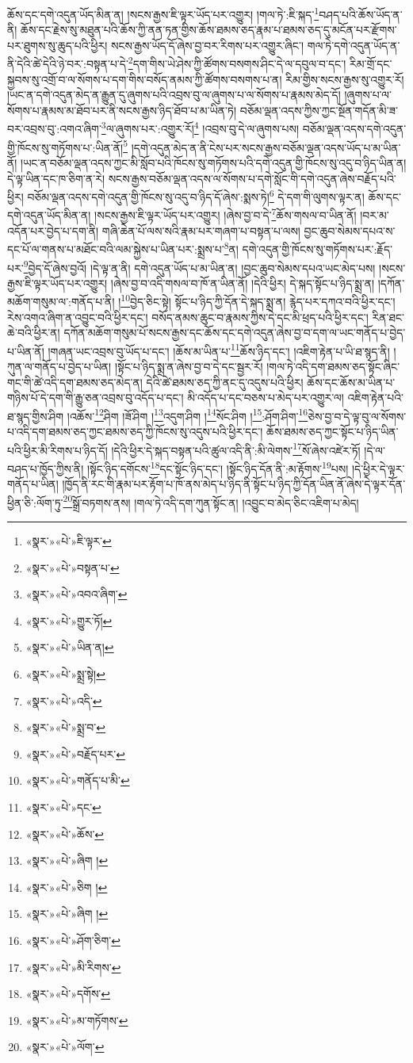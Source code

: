 ཆོས་དང་དགེ་འདུན་ཡོད་མིན་ན། །སངས་རྒྱས་ཇི་ལྟར་ཡོད་པར་འགྱུར། །གལ་ཏེ་:ཇི་སྐད་\footnote{«སྣར་»«པེ་»ཇི་ལྟར་}བཤད་པའི་ཆོས་ཡོད་ན་ནི། ཆོས་དང་རྗེས་སུ་མཐུན་པའི་ཆོས་ཀྱི་ནན་ཏན་གྱིས་ཆོས་ཐམས་ཅད་རྣམ་པ་ཐམས་ཅད་དུ་མངོན་པར་རྫོགས་པར་ཐུགས་སུ་ཆུད་པའི་ཕྱིར། སངས་རྒྱས་ཡོད་དོ་ཞེས་བྱ་བར་རིགས་པར་འགྱུར་ཞིང་། གལ་ཏེ་དགེ་འདུན་ཡོད་ན་ནི་དེའི་ཚེ་དེའི་ཉེ་བར་:བསྟན་པ་དེ་\footnote{«སྣར་»«པེ་»བསྟན་པ་}དག་གིས་ཡེ་ཤེས་ཀྱི་ཚོགས་བསགས་ཤིང་དེ་ལ་དབུལ་བ་དང་། རིམ་གྲོ་དང་སྐྱབས་སུ་འགྲོ་བ་ལ་སོགས་པ་དག་གིས་བསོད་ནམས་ཀྱི་ཚོགས་བསགས་པ་ན། རིམ་གྱིས་སངས་རྒྱས་སུ་འགྱུར་རོ། །ཡང་ན་དགེ་འདུན་མེད་ན་རྒྱུན་དུ་ཞུགས་པའི་འབྲས་བུ་ལ་ཞུགས་པ་ལ་སོགས་པ་རྣམས་མེད་དོ། །ཞུགས་པ་ལ་སོགས་པ་རྣམས་མ་ཐོབ་པར་ནི་སངས་རྒྱས་ཉིད་ཐོབ་པ་མ་ཡིན་ཏེ། བཅོམ་ལྡན་འདས་ཀྱིས་ཀྱང་སྔོན་གདོན་མི་ཟ་བར་འབྲས་བུ་:འགའ་ཞིག་\footnote{«སྣར་»«པེ་»འབའ་ཞིག་}ལ་ཞུགས་པར་:འགྱུར་རོ།\footnote{«སྣར་»«པེ་»གྱུར་ཏོ།} །འབྲས་བུ་དེ་ལ་ཞུགས་པས། བཅོམ་ལྡན་འདས་དགེ་འདུན་གྱི་ཁོངས་སུ་གཏོགས་པ་:ཡིན་ནོ།\footnote{«སྣར་»«པེ་»ཡིན་ན།} །དགེ་འདུན་མེད་ན་ནི་ངེས་པར་སངས་རྒྱས་བཅོམ་ལྡན་འདས་ཡོད་པ་མ་ཡིན་ནོ། །ཡང་ན་བཅོམ་ལྡན་འདས་ཀྱང་མི་སློབ་པའི་ཁོངས་སུ་གཏོགས་པའི་དགེ་འདུན་གྱི་ཁོངས་སུ་འདུ་བ་ཉིད་ཡིན་ན། དེ་ལྟ་ཡིན་དང་ཁ་ཅིག་ན་རེ། སངས་རྒྱས་བཅོམ་ལྡན་འདས་ལ་སོགས་པ་དགེ་སློང་གི་དགེ་འདུན་ཞེས་བརྗོད་པའི་ཕྱིར། བཅོམ་ལྡན་འདས་དགེ་འདུན་གྱི་ཁོངས་སུ་འདུ་བ་ཉིད་དོ་ཞེས་:སྨས་ཏེ།\footnote{«སྣར་»«པེ་»སྨྲ་སྟེ།} དེ་དག་གི་ལུགས་ལྟར་ན། ཆོས་དང་དགེ་འདུན་ཡོད་མིན་ན། །སངས་རྒྱས་ཇི་ལྟར་ཡོད་པར་འགྱུར། །ཞེས་བྱ་བ་དེ་\footnote{«སྣར་»«པེ་»འདི་}ཆོས་གསལ་བ་ཡིན་ནོ། །བར་མ་འདོན་པར་བྱེད་པ་དག་ནི། གཞི་ཆེན་པོ་ལས་སའི་རྣམ་པར་གཞག་པ་བསྟན་པ་ལས། བྱང་ཆུབ་སེམས་དཔའ་ས་དང་པོ་ལ་གནས་པ་མཐོང་བའི་ལམ་སྐྱེས་པ་ཡིན་པར་:སྨྲས་པ་\footnote{«སྣར་»«པེ་»སྨྲ་བ་}ན། དགེ་འདུན་གྱི་ཁོངས་སུ་གཏོགས་པར་:རྗོད་པར་\footnote{«སྣར་»«པེ་»བརྗོད་པར་}བྱེད་དོ་ཞེས་བྱའོ། །དེ་ལྟ་ན་ནི། དགེ་འདུན་ཡོད་པ་མ་ཡིན་ན། །བྱང་ཆུབ་སེམས་དཔའ་ཡང་མེད་པས། །སངས་རྒྱས་ཇི་ལྟར་ཡོད་པར་འགྱུར། །ཞེས་བྱ་བ་འདི་གསལ་བ་ཁོ་ན་ཡིན་ནོ། །དེའི་ཕྱིར། དེ་སྐད་སྟོང་པ་ཉིད་སྨྲ་ན། །དཀོན་མཆོག་གསུམ་ལ་:གནོད་པ་ནི། །\footnote{«སྣར་»«པེ་»གནོད་པ་མི་}བྱེད་ཅིང་སྟེ། སྟོང་པ་ཉིད་ཀྱི་དོན་དེ་སྐད་སྨྲ་ན། རྙེད་པར་དཀའ་བའི་ཕྱིར་དང་། རེས་འགའ་ཞིག་ན་འབྱུང་བའི་ཕྱིར་དང་། བསོད་ནམས་ཆུང་བ་རྣམས་ཀྱིས་དེ་དང་མི་ཕྲད་པའི་ཕྱིར་དང་། རིན་ཐང་ཆེ་བའི་ཕྱིར་ན། དཀོན་མཆོག་གསུམ་པོ་སངས་རྒྱས་དང་ཆོས་དང་དགེ་འདུན་ཞེས་བྱ་བ་དག་ལ་ཡང་གནོད་པ་བྱེད་པ་ཡིན་ནོ། །གཞན་ཡང་འབྲས་བུ་ཡོད་པ་དང་། །ཆོས་མ་ཡིན་པ་\footnote{«སྣར་»«པེ་»དང་}ཆོས་ཉིད་དང་། །འཇིག་རྟེན་པ་ཡི་ཐ་སྙད་ནི། །ཀུན་ལ་གནོད་པ་བྱེད་པ་ཡིན། །སྟོང་པ་ཉིད་སྨྲ་ན་ཞེས་བྱ་བ་དེ་དང་སྦྱར་རོ། །གལ་ཏེ་འདི་དག་ཐམས་ཅད་སྟོང་ཞིང་གང་གི་ཚེ་འདི་དག་ཐམས་ཅད་མེད་ན། དེའི་ཚེ་ཐམས་ཅད་ཀྱི་ནང་དུ་འདུས་པའི་ཕྱིར། ཆོས་དང་ཆོས་མ་ཡིན་པ་གཉིས་པོ་དེ་དག་གི་རྒྱུ་ཅན་འབྲས་བུ་འདོད་པ་དང་། མི་འདོད་པ་དང་བཅས་པ་མེད་པར་འགྱུར་ལ། འཇིག་རྟེན་པའི་ཐ་སྙད་གྱིས་ཤིག །འཆོས་\footnote{«སྣར་»«པེ་»ཆོས་}ཤིག །ཟོ་ཤིག །\footnote{«སྣར་»«པེ་»ཞིག །}འདུག་ཤིག །\footnote{«སྣར་»«པེ་»ཅིག །}སོང་ཤིག །\footnote{«སྣར་»«པེ་»ཞིག །}:ཤོག་ཤིག་\footnote{«སྣར་»«པེ་»ཤོག་ཅིག་}ཅེས་བྱ་བ་དེ་ལྟ་བུ་ལ་སོགས་པ་འདི་དག་ཐམས་ཅད་ཀྱང་ཐམས་ཅད་ཀྱི་ཁོངས་སུ་འདུས་པའི་ཕྱིར་དང་། ཆོས་ཐམས་ཅད་ཀྱང་སྟོང་པ་ཉིད་ཡིན་པའི་ཕྱིར་མི་རིགས་པ་ཉིད་དོ། །དེའི་ཕྱིར་དེ་སྐད་བསྟན་པའི་ཚུལ་འདི་ནི་:མི་ལེགས་\footnote{«སྣར་»«པེ་»མི་རིགས་}སོ་ཞེས་འཛེར་ཏོ། །དེ་ལ་བཤད་པ་ཁྱོད་ཀྱིས་ནི། །སྟོང་ཉིད་དགོངས་\footnote{«སྣར་»«པེ་»དགོས་}དང་སྟོང་ཉིད་དང་། །སྟོང་ཉིད་དོན་ནི་:མ་རྟོགས་\footnote{«སྣར་»«པེ་»མ་གཏོགས་}པས། །དེ་ཕྱིར་དེ་ལྟར་གནོད་པ་ཡིན། །ཁྱོད་ནི་རང་གི་རྣམ་པར་རྟོག་པ་ཁོ་ནས་མེད་པ་ཉིད་ནི་སྟོང་པ་ཉིད་ཀྱི་དོན་ཡིན་ནོ་ཞེས་དེ་ལྟར་དོན་ཕྱིན་ཅི་:ལོག་ཏུ་\footnote{«སྣར་»«པེ་»ལོག་}སྒྲོ་བཏགས་ནས། །གལ་ཏེ་འདི་དག་ཀུན་སྟོང་ན། །འབྱུང་བ་མེད་ཅིང་འཇིག་པ་མེད། 